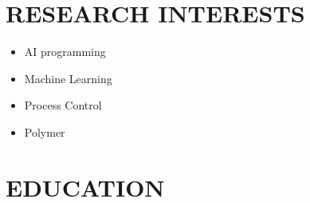 \documentclass[10pt,a4paper,sans]{moderncv} %
\begin{document}
	
	\makecvtitle
	
	\section{RESEARCH INTERESTS}
	\begin{itemize}
		 
		   \begin{itemize}
		    \item AI programming
		     \item Machine Learning
		     
		   \end{itemize}
		
		
		
		      \begin{itemize}
		       \item Process Control
		       \item Polymer
		      \end{itemize}
		     
	\end{itemize}
	
	\vspace{-0.9em}
	
	\section{EDUCATION}
	
\end{document}
